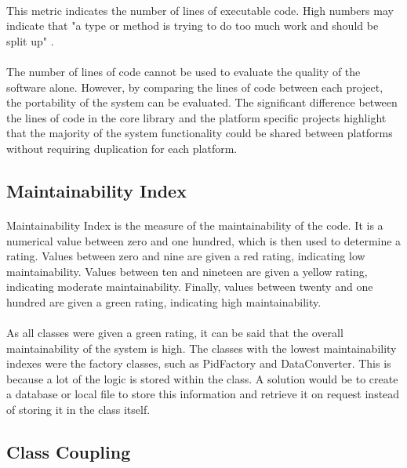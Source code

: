 {		\paragraph{}{
		This metric indicates the number of lines of executable code. High numbers may indicate that "a type or method is trying to do too much work and should be split up" \cite{CodeMetrics}.
		}
		\paragraph{}{
		The number of lines of code cannot be used to evaluate the quality of the software alone. However,  by comparing the lines of code between each project, the portability of the system can be evaluated. The significant difference between the lines of code in the core library and the platform specific projects highlight that the majority of the system functionality could be shared between platforms without requiring duplication for each platform.
		}
		
	\subsection*{Maintainability Index}
		\paragraph{}{
		Maintainability Index is the measure of the maintainability of the code. It is a numerical value between zero and one hundred, which is then used to determine a rating. Values between zero and nine are given a red rating, indicating low maintainability. Values between ten and nineteen are given a yellow rating, indicating moderate maintainability. Finally, values between twenty and one hundred are given a green rating, indicating high maintainability.
		}
		\paragraph{}{
		As all classes were given a green rating, it can be said that the overall maintainability of the system is high. The classes with the lowest maintainability indexes were the factory classes, such as PidFactory and DataConverter. This is because a lot of the logic is stored within the class. A solution would be to create a database or local file to store this information and retrieve it on request instead of storing it in the class itself.
		}
	
	\subsection*{Class Coupling}
}
